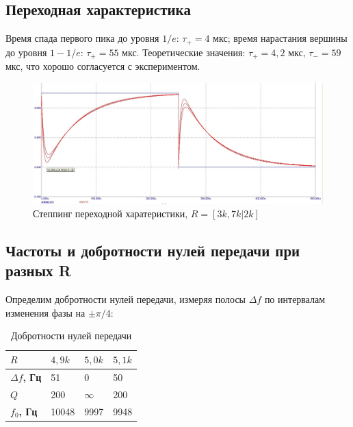 \documentclass[a4paper, 12pt]{article}
\begin{document}
\subsection*{Переходная характеристика}
Время спада первого пика до уровня $1/e$: $\tau_{+} = 4$ мкс; время нарастания вершины до уровня $1-1/e$: $\tau_{+} = 55$ мкс. Теоретические значения: $\tau_+ = 4,2$ мкс, $\tau_- = 59$ мкс, что хорошо согласуется с экспериментом.
\begin{figure}[H]
\centering
\includegraphics[width=1\textwidth]{2tbridgetran}
\caption{Степпинг переходной харатеристики, $R = [3k,7k|2k]$}
\end{figure}
\subsection*{Частоты и добротности нулей передачи при разных R}
Определим добротности нулей передачи, измеряя полосы $\Delta f$ по интервалам изменения фазы на $\pm \pi/4$:

\begin{table}[H]
\centering
\begin{tabular}{|l|l|l|l|}
\hline
\textbf{$R$}            & $4,9k$ & $5,0k$   & $5,1k$ \\ \hline
\textbf{$\Delta f$, Гц} & 51     & 0        & 50     \\ \hline
\textbf{$Q$}            & 200    & $\infty$ & 200    \\ \hline
\textbf{$f_0$, Гц}      & 10048  & 9997     & 9948   \\ \hline
\end{tabular}
\caption{Добротности нулей передачи}
\label{my-label}
\end{table}
\end{document}
